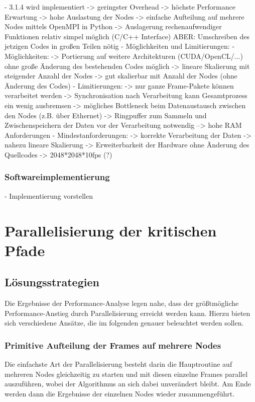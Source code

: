 - 3.1.4 wird implementiert
-> geringster Overhead
-> höchste Performance Erwartung
-> hohe Auslastung der Nodes
-> einfache Aufteilung auf mehrere Nodes mittels OpenMPI in Python
-> Auslagerung rechenaufwendiger Funktionen relativ simpel möglich (C/C++ Interface)
ABER: Umschreiben des jetzigen Codes in großen Teilen nötig
- Möglichkeiten und Limitierungen:
- Möglichkeiten:
-> Portierung auf weitere Architekturen (CUDA/OpenCL/...) ohne große Änderung des bestehenden Codes möglich
-> lineare Skalierung mit steigender Anzahl der Nodes
-> gut skalierbar mit Anzahl der Nodes (ohne Änderung des Codes)
- Limitierungen:
-> nur ganze Frame-Pakete können verarbeitet werden
-> Synchronisation nach Verarbeitung kann Gesamtprozess ein wenig ausbremsen
-> mögliches Bottleneck beim Datenaustausch zwischen den Nodes (z.B. über Ethernet)
-> Ringpuffer zum Sammeln und Zwischenspeichern der Daten vor der Verarbeitung notwendig --> hohe RAM Anforderungen
- Mindestanforderungen:
-> korrekte Verarbeitung der Daten
-> nahezu lineare Skalierung
-> Erweiterbarkeit der Hardware ohne Änderung des Quellcodes
-> 2048*2048*10fps (?)

\subsection{Softwareimplementierung}

- Implementierung vorstellen

\chapter{Parallelisierung der kritischen Pfade}

\section{Lösungsstrategien}

Die Ergebnisse der Performance-Analyse legen nahe, dass der größtmögliche Performance-Anstieg durch Parallelisierung erreicht werden kann. Hierzu bieten sich verschiedene Ansätze, die im folgenden genauer beleuchtet werden sollen. 

\subsection{Primitive Aufteilung der Frames auf mehrere Nodes}
\label{subsec:primitive_splitting}

Die einfachste Art der Parallelisierung besteht darin die Hauptroutine auf mehreren Nodes gleichzeitig zu starten und mit diesen einzelne Frames parallel auszuführen, wobei der Algorithmus an sich dabei unverändert bleibt. 
Am Ende werden dann die Ergebnisse der einzelnen Nodes wieder zusammengeführt.

